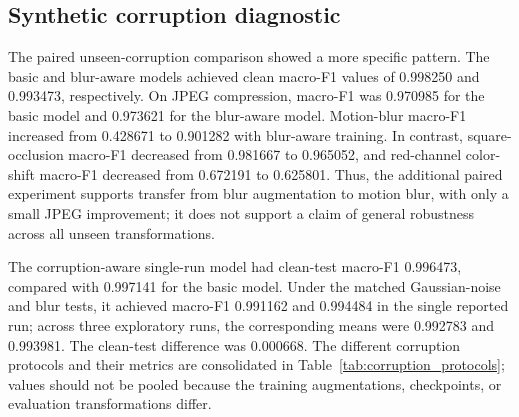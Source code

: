 \documentclass[12pt]{article}
\begin{document}
\subsection{Synthetic corruption diagnostic}
The paired unseen-corruption comparison showed a more specific pattern. The basic and blur-aware models achieved clean macro-F1 values of 0.998250 and 0.993473, respectively. On JPEG compression, macro-F1 was 0.970985 for the basic model and 0.973621 for the blur-aware model. Motion-blur macro-F1 increased from 0.428671 to 0.901282 with blur-aware training. In contrast, square-occlusion macro-F1 decreased from 0.981667 to 0.965052, and red-channel color-shift macro-F1 decreased from 0.672191 to 0.625801. Thus, the additional paired experiment supports transfer from blur augmentation to motion blur, with only a small JPEG improvement; it does not support a claim of general robustness across all unseen transformations.

The corruption-aware single-run model had clean-test macro-F1 0.996473, compared with 0.997141 for the basic model. Under the matched Gaussian-noise and blur tests, it achieved macro-F1 0.991162 and 0.994484 in the single reported run; across three exploratory runs, the corresponding means were 0.992783 and 0.993981. The clean-test difference was 0.000668. The different corruption protocols and their metrics are consolidated in Table~\ref{tab:corruption_protocols}; values should not be pooled because the training augmentations, checkpoints, or evaluation transformations differ.
\begin{table}[p]\centering\small{}\caption{Macro-F1 across corruption protocols. Dashes indicate transformations not evaluated in that protocol. The additional basic evaluation used a separate run from the paired experiment, explaining its different values.}\label{tab:corruption_protocols}\end{table}\clearpage
\end{document}
